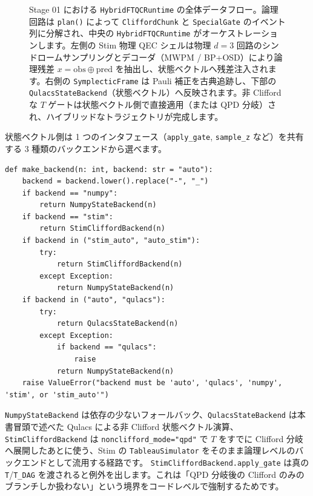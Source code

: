 \begin{figure}[htbp]
{\begin{tikzpicture}
  \end{tikzpicture}%
  }
  \caption{Stage 01 における \texttt{HybridFTQCRuntime} の全体データフロー。論理回路は \texttt{plan()} によって \texttt{CliffordChunk} と \texttt{SpecialGate} のイベント列に分解され、中央の \texttt{HybridFTQCRuntime} がオーケストレーションします。左側の Stim 物理 QEC シェルは物理 $d=3$ 回路のシンドロームサンプリングとデコーダ（MWPM / BP+OSD）により論理残差 $x = \mathrm{obs} \oplus \mathrm{pred}$ を抽出し、状態ベクトルへ残差注入されます。右側の \texttt{SymplecticFrame} は Pauli 補正を古典追跡し、下部の \texttt{QulacsStateBackend}（状態ベクトル）へ反映されます。非 Clifford な $T$ ゲートは状態ベクトル側で直接適用（または QPD 分岐）され、ハイブリッドなトラジェクトリが完成します。}
  \label{fig:ch13_runtime_dataflow}
\end{figure}

状態ベクトル側は 1 つのインタフェース（\texttt{apply\_gate}, \texttt{sample\_z} など）を共有する 3 種類のバックエンドから選べます。

\begin{lstlisting}[caption={src/stages/01\_mpp/src/ftqc/hybrid\_ftqc\_runtime.py のバックエンド選択（抜粋・行340--358）}]
def make_backend(n: int, backend: str = "auto"):
    backend = backend.lower().replace("-", "_")
    if backend == "numpy":
        return NumpyStateBackend(n)
    if backend == "stim":
        return StimCliffordBackend(n)
    if backend in ("stim_auto", "auto_stim"):
        try:
            return StimCliffordBackend(n)
        except Exception:
            return NumpyStateBackend(n)
    if backend in ("auto", "qulacs"):
        try:
            return QulacsStateBackend(n)
        except Exception:
            if backend == "qulacs":
                raise
            return NumpyStateBackend(n)
    raise ValueError("backend must be 'auto', 'qulacs', 'numpy', 'stim', or 'stim_auto'")
\end{lstlisting}

\texttt{NumpyStateBackend} は依存の少ないフォールバック、\texttt{QulacsStateBackend} は本書冒頭で述べた Qulacs による非 Clifford 状態ベクトル演算、\texttt{StimCliffordBackend} は \texttt{nonclifford\_mode="qpd"} で $T$ をすでに Clifford 分岐へ展開したあとに使う、Stim の \texttt{TableauSimulator} をそのまま論理レベルのバックエンドとして流用する経路です。
\texttt{StimCliffordBackend.apply\_gate} は真の \texttt{T}/\texttt{T\_DAG} を渡されると例外を出します。これは「QPD 分岐後の Clifford のみのブランチしか扱わない」という境界をコードレベルで強制するためです。

